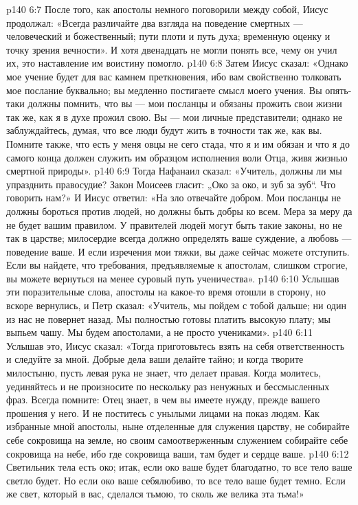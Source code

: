 \vs p140 6:7 После того, как апостолы немного поговорили между собой, Иисус продолжал: «Всегда различайте два взгляда на поведение смертных --- человеческий и божественный; пути плоти и путь духа; временную оценку и точку зрения вечности». И хотя двенадцать не могли понять все, чему он учил их, это наставление им воистину помогло.
\vs p140 6:8 Затем Иисус сказал: «Однако мое учение будет для вас камнем преткновения, ибо вам свойственно толковать мое послание буквально; вы медленно постигаете смысл моего учения. Вы опять\hyp{}таки должны помнить, что вы --- мои посланцы и обязаны прожить свои жизни так же, как я в духе прожил свою. Вы --- мои личные представители; однако не заблуждайтесь, думая, что все люди будут жить в точности так же, как вы. Помните также, что есть у меня овцы не сего стада, что я и им обязан и что я до самого конца должен служить им образцом исполнения воли Отца, живя жизнью смертной природы».
\vs p140 6:9 Тогда Нафанаил сказал: «Учитель, должны ли мы упразднить правосудие? Закон Моисеев гласит: „Око за око, и зуб за зуб“. Что говорить нам?» И Иисус ответил: «На зло отвечайте добром. Мои посланцы не должны бороться против людей, но должны быть добры ко всем. Мера за меру да не будет вашим правилом. У правителей людей могут быть такие законы, но не так в царстве; милосердие всегда должно определять ваше суждение, а любовь --- поведение ваше. И если изречения мои тяжки, вы даже сейчас можете отступить. Если вы найдете, что требования, предъявляемые к апостолам, слишком строгие, вы можете вернуться на менее суровый путь ученичества».
\vs p140 6:10 Услышав эти поразительные слова, апостолы на какое\hyp{}то время отошли в сторону, но вскоре вернулись, и Петр сказал: «Учитель, мы пойдем с тобой дальше; ни один из нас не повернет назад. Мы полностью готовы платить высокую плату; мы выпьем чашу. Мы будем апостолами, а не просто учениками».
\vs p140 6:11 Услышав это, Иисус сказал: «Тогда приготовьтесь взять на себя ответственность и следуйте за мной. Добрые дела ваши делайте тайно; и когда творите милостыню, пусть левая рука не знает, что делает правая. Когда молитесь, уединяйтесь и не произносите по нескольку раз ненужных и бессмысленных фраз. Всегда помните: Отец знает, в чем вы имеете нужду, прежде вашего прошения у него. И не поститесь с унылыми лицами на показ людям. Как избранные мной апостолы, ныне отделенные для служения царству, не собирайте себе сокровища на земле, но своим самоотверженным служением собирайте себе сокровища на небе, ибо где сокровища ваши, там будет и сердце ваше.
\vs p140 6:12 Светильник тела есть око; итак, если око ваше будет благодатно, то все тело ваше светло будет. Но если око ваше себялюбиво, то все тело ваше будет темно. Если же свет, который в вас, сделался тьмою, то сколь же велика эта тьма!»
